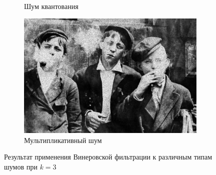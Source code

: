 \begin{figure}[ht]
\begin{subfigure}[b]{0.5\linewidth}
      \caption{Шум квантования} 
      \label{weiner_3:e}
    \end{subfigure}%
    \begin{subfigure}[b]{0.5\linewidth}
        \centering
        \includegraphics[width=0.95\linewidth]{../Wiener_Filter/Wiener_Speckle_noise_(k=3).jpg} 
        \caption{Мультипликативный шум} 
        \label{weiner_3:f} 
    \end{subfigure} 
    \caption{Результат применения Винеровской фильтрации к различным типам шумов при $k = 3$}
    \label{img:weiner_3} 
\end{figure}


